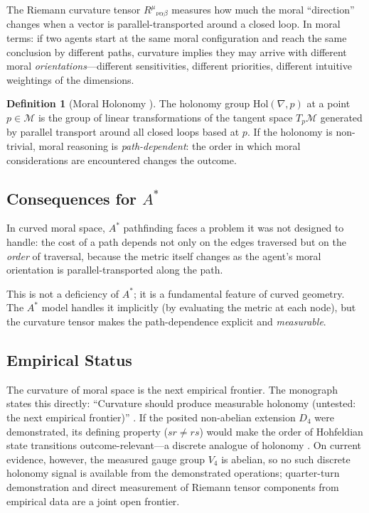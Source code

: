\documentclass[12pt]{article}
\theoremstyle{definition}
\newtheorem{definition}[theorem]{Definition}
\theoremstyle{remark}
\newcommand{\M}{\mathcal{M}}
\begin{document}
The Riemann curvature tensor $R^\mu{}_{\nu\alpha\beta}$ measures how much the moral ``direction'' changes when a vector is parallel-transported around a closed loop. In moral terms: if two agents start at the same moral configuration and reach the same conclusion by different paths, curvature implies they may arrive with different moral \emph{orientations}---different sensitivities, different priorities, different intuitive weightings of the dimensions.

\begin{definition}[Moral Holonomy {\citep[\S8.9]{anonymous2026ge}}]
The holonomy group $\mathrm{Hol}(\nabla, p)$ at a point $p \in \M$ is the group of linear transformations of the tangent space $T_p\M$ generated by parallel transport around all closed loops based at $p$. If the holonomy is non-trivial, moral reasoning is \emph{path-dependent}: the order in which moral considerations are encountered changes the outcome.
\end{definition}

\subsection{Consequences for $A^*$}

In curved moral space, $A^*$ pathfinding faces a problem it was not designed to handle: the cost of a path depends not only on the edges traversed but on the \emph{order} of traversal, because the metric itself changes as the agent's moral orientation is parallel-transported along the path.

This is not a deficiency of $A^*$; it is a fundamental feature of curved geometry. The $A^*$ model handles it implicitly (by evaluating the metric at each node), but the curvature tensor makes the path-dependence explicit and \emph{measurable}.

\subsection{Empirical Status}

The curvature of moral space is the next empirical frontier. The monograph states this directly: ``Curvature should produce measurable holonomy (untested: the next empirical frontier)'' \citep[\S22]{anonymous2026ge}. If the posited non-abelian extension $D_4$ were demonstrated, its defining property ($sr \neq rs$) would make the order of Hohfeldian state transitions outcome-relevant---a discrete analogue of holonomy \citep{hohfeld1913}. On current evidence, however, the measured gauge group $V_4$ is abelian, so no such discrete holonomy signal is available from the demonstrated operations; quarter-turn demonstration and direct measurement of Riemann tensor components from empirical data are a joint open frontier.
\end{document}
